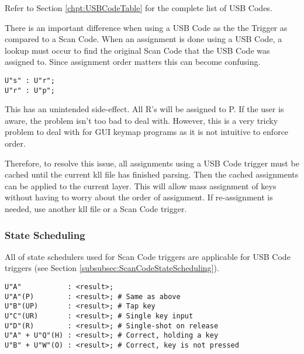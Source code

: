 \documentclass{kiibohd-template}
\begin{document}
Refer to Section \ref{chpt:USBCodeTable} for the complete list of USB Codes.

There is an important difference when using a USB Code as the the Trigger as compared to a Scan Code.
When an assignment is done using a USB Code, a lookup must occur to find the original Scan Code that the USB Code was assigned to.
Since assignment order matters this can become confusing.

\begin{lstlisting}
U"s" : U"r";
U"r" : U"p";
\end{lstlisting}

This has an unintended side-effect.
All R's will be assigned to P.
If the user is aware, the problem isn't too bad to deal with.
However, this is a very tricky problem to deal with for GUI keymap programs as it is not intuitive to enforce order.

Therefore, to resolve this issue, all assignments using a USB Code trigger must be cached until the current kll file has finished parsing.
Then the cached assignments can be applied to the current layer.
This will allow mass assignment of keys without having to worry about the order of assignment.
If re-assignment is needed, use another kll file or a Scan Code trigger.


\subsubsection{State Scheduling}
\label{subsubsec:trigusbstateschedule}

All of state schedulers used for Scan Code triggers are applicable for USB Code triggers (see Section \ref{subsubsec:ScanCodeStateScheduling}).

\begin{lstlisting}
U"A"           : <result>;
U"A"(P)        : <result>; # Same as above
U"B"(UP)       : <result>; # Tap key
U"C"(UR)       : <result>; # Single key input
U"D"(R)        : <result>; # Single-shot on release
U"A" + U"Q"(H) : <result>; # Correct, holding a key
U"B" + U"W"(O) : <result>; # Correct, key is not pressed
\end{lstlisting}




\end{document}
